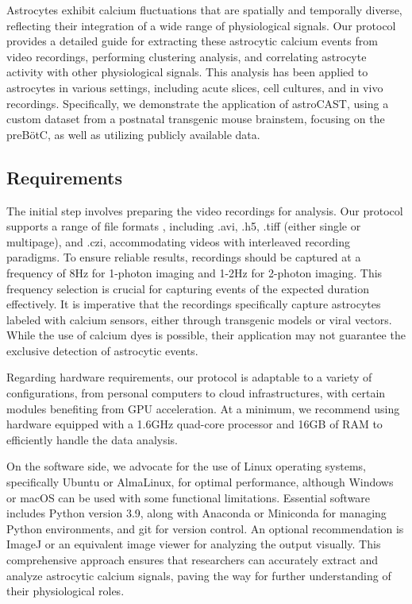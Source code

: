 
Astrocytes exhibit calcium fluctuations that are spatially and temporally diverse, reflecting their integration of a
wide range of physiological signals\citep{semyanov_making_2020,smedler_frequency_2014}. Our protocol provides a
detailed guide for extracting these astrocytic calcium events from video recordings, performing clustering analysis,
and correlating astrocyte activity with other physiological signals. This analysis has been applied to
astrocytes in various settings, including acute slices, cell cultures, and in vivo recordings. Specifically, we
demonstrate the application of astroCAST, using a custom dataset from a postnatal transgenic mouse brainstem,
focusing on the \ac{preBötC}, as well as utilizing publicly available data.

\subsection{Requirements}
The initial step involves preparing the video recordings for analysis. Our protocol supports a range of file formats
, including .avi, .h5, .tiff (either single or multipage), and .czi, accommodating videos with interleaved recording
paradigms. To ensure reliable results, recordings should be captured at a frequency of 8Hz for 1-photon imaging and
1-2Hz for 2-photon imaging. This frequency selection is crucial for capturing events of the expected duration
effectively. It is imperative that the recordings specifically capture astrocytes labeled with calcium sensors,
either through transgenic models or viral vectors. While the use of calcium dyes is possible, their application may
not guarantee the exclusive detection of astrocytic events.

Regarding hardware requirements, our protocol is adaptable to a variety of configurations, from personal computers to
cloud infrastructures, with certain modules benefiting from GPU acceleration. At a minimum, we recommend using
hardware equipped with a 1.6GHz quad-core processor and 16GB of RAM to efficiently handle the data analysis.

On the software side, we advocate for the use of Linux operating systems, specifically Ubuntu or AlmaLinux, for
optimal performance, although Windows or macOS can be used with some functional limitations. Essential software
includes Python version 3.9, along with Anaconda or Miniconda for managing Python environments, and git for version
control. An optional recommendation is ImageJ or an equivalent image viewer for analyzing the output visually. This
comprehensive approach ensures that researchers can accurately extract and analyze astrocytic calcium signals, paving
the way for further understanding of their physiological roles.